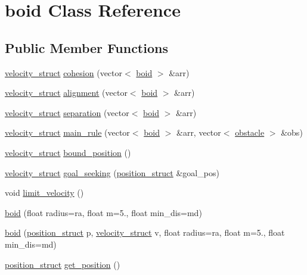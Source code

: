 \hypertarget{classboid}{}\section{boid Class Reference}
\label{classboid}
\subsection*{Public Member Functions}
\begin{DoxyCompactItemize}
\item 
\hyperlink{structvelocity__struct}{velocity\+\_\+struct} \hyperlink{classboid_a4e4873c1aca56bf788cb95efaec683be}{cohesion} (vector$<$ \hyperlink{classboid}{boid} $>$ \&arr)
\item 
\hyperlink{structvelocity__struct}{velocity\+\_\+struct} \hyperlink{classboid_a6f413e43a8af15b9efdd633f56be1964}{alignment} (vector$<$ \hyperlink{classboid}{boid} $>$ \&arr)
\item 
\hyperlink{structvelocity__struct}{velocity\+\_\+struct} \hyperlink{classboid_acedf9d5afe588e5a412c1994fff34667}{separation} (vector$<$ \hyperlink{classboid}{boid} $>$ \&arr)
\item 
\hyperlink{structvelocity__struct}{velocity\+\_\+struct} \hyperlink{classboid_aa53aa2520e839090d9af66f5f268b8c1}{main\+\_\+rule} (vector$<$ \hyperlink{classboid}{boid} $>$ \&arr, vector$<$ \hyperlink{classobstacle}{obstacle} $>$ \&obs)
\item 
\hyperlink{structvelocity__struct}{velocity\+\_\+struct} \hyperlink{classboid_a1e9d329d17507f3af359f58dfa75f242}{bound\+\_\+position} ()
\item 
\hyperlink{structvelocity__struct}{velocity\+\_\+struct} \hyperlink{classboid_a0486923cfe0a69214c4bbef8f8e71ab7}{goal\+\_\+seeking} (\hyperlink{structposition__struct}{position\+\_\+struct} \&goal\+\_\+pos)
\item 
void \hyperlink{classboid_a68f7345808add886ba407975c66db31b}{limit\+\_\+velocity} ()
\item 
\hyperlink{classboid_ab065676b1ebd753fb23052962800f535}{boid} (float radius=ra, float m=5., float min\+\_\+dis=md)
\item 
\hyperlink{classboid_a72162553ff7206c51d6786edd0191e48}{boid} (\hyperlink{structposition__struct}{position\+\_\+struct} p, \hyperlink{structvelocity__struct}{velocity\+\_\+struct} v, float radius=ra, float m=5., float min\+\_\+dis=md)
\item 
\hyperlink{structposition__struct}{position\+\_\+struct} \hyperlink{classboid_ad75c1d5227fc84dd34417a8d3bb13c38}{get\+\_\+position} ()

\end{DoxyCompactItemize}
